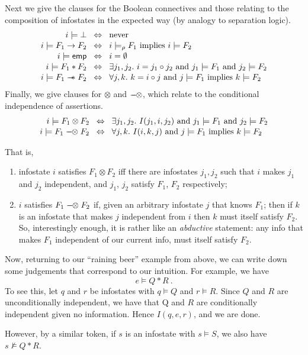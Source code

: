 \documentclass[envcountsame,envcountsect]{llncs}
\renewcommand{\iff}{\Leftrightarrow}
\newcommand{\emp}{\mathsf{emp}}
\newcommand{\wand}{%
  \mathrel{\mbox{$\hspace*{-0.03em}\mathord{-}\hspace*{-0.66em}
  \mathord{-}\hspace*{-0.36em}\mathord{*}$\hspace*{-0.005em}}}}
\newcommand{\lolly}{%
  \mathrel{\mbox{$\hspace*{-0.03em}\mathord{-}\hspace*{-0.66em}
  \mathord{-}\hspace*{-0.16em}\mathord{\otimes}$\hspace*{-0.005em}}}}
\newcommand{\false}{\bot}
\newcommand{\indep}[3]{I({#1},{#2},{#3})}
\theoremstyle{plain}
\begin{document}
Next we give the clauses for the Boolean connectives and those relating to the composition of infostates in the expected way (by analogy to separation logic).
\[\begin{array}{r@{\hspace{0.3cm}}c@{\hspace{0.3cm}}l}
i \models \false & \iff & \mbox{never} \\[0.2ex]
i \models F_1 \rightarrow F_2 & \iff & i \models_\rho F_1 \mbox{ implies } i \models F_2 \\[0.2ex]
i \models \emp & \iff & i = \emptyset \\[0.2ex]
i \models F_1 * F_2 & \iff & \exists j_1,j_2.\ i = j_1 \circ j_2 \mbox{ and } j_1 \models F_1 \mbox{ and } j_2 \models F_2 \\[0.2ex]
i \models F_1 \wand F_2 & \iff & \forall j, k.\ k = i \circ j \mbox{ and } j \models F_1 \mbox{ implies } k \models F_2
\end{array}\]
Finally, we give clauses for $\otimes$ and $\lolly$, which relate to the conditional independence of assertions.
\[\begin{array}{r@{\hspace{0.3cm}}c@{\hspace{0.3cm}}l}
i \models F_1 \otimes F_2 & \iff & \exists j_1,j_2.\ \indep{j_1}{i}{j_2} \mbox{ and } j_1 \models F_1 \mbox{ and } j_2 \models F_2 \\[0.2ex] 
i \models F_1 \lolly F_2 & \iff & \forall j,k.\ \indep{i}{k}{j} \mbox{ and } j \models F_1 \mbox{ implies } k \models F_2
\end{array}\]

That is, 
\begin{enumerate}
\item infostate $i$ satisfies $F_1 \otimes F_2$ iff there are infostates $j_1,j_2$ such that $i$ makes $j_1$ and $j_2$ independent, and  $j_1$, $j_2$ satisfy $F_1$, $F_2$ respectively;

\item $i$ satisfies $F_1 \lolly F_2$ if, given an arbitrary infostate $j$ that knows $F_1$; then if $k$ is an infostate that makes $j$ independent from $i$ then $k$ must itself satisfy $F_2$. So, interestingly enough, it is rather like an \emph{abductive} statement: any info that makes $F_1$ independent of our current info, must itself satisfy $F_2$.
\end{enumerate}

\begin{example}
Now, returning to our ``raining beer'' example from above, we
can write down some judgements that correspond to our intuition.
For example, we have
\[
e \models Q * R\ .
\]
To see this, let $q$ and $r$ be infostates with $q \models Q$ and $r \models R$. Since
$Q$ and $R$ are unconditionally independent, we have that Q and
$R$ are conditionally independent given no information. Hence $\indep{q}{e}{r}$, and we are done.

However, by a similar token, if $s$ is an infostate with $s \models S$, we also have $s \not\models Q * R$.
\end{example}
\end{document}
